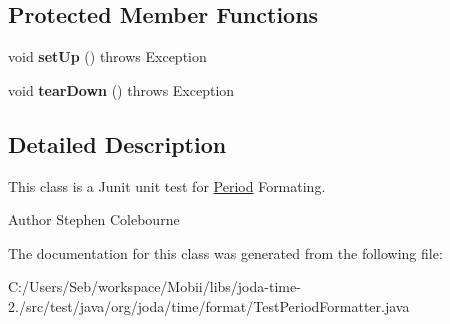 \subsection*{Protected Member Functions}
\begin{DoxyCompactItemize}
\item 
\hypertarget{classorg_1_1joda_1_1time_1_1format_1_1_test_period_formatter_a0102eee1098c9f7e67a7e91f46eb4d3b}{void {\bfseries set\-Up} ()  throws Exception }\label{classorg_1_1joda_1_1time_1_1format_1_1_test_period_formatter_a0102eee1098c9f7e67a7e91f46eb4d3b}

\item 
\hypertarget{classorg_1_1joda_1_1time_1_1format_1_1_test_period_formatter_a5f4ade6b1fa1a08fab2adf672f0fbd80}{void {\bfseries tear\-Down} ()  throws Exception }\label{classorg_1_1joda_1_1time_1_1format_1_1_test_period_formatter_a5f4ade6b1fa1a08fab2adf672f0fbd80}

\end{DoxyCompactItemize}


\subsection{Detailed Description}
This class is a Junit unit test for \hyperlink{classorg_1_1joda_1_1time_1_1_period}{Period} Formating.

\begin{DoxyAuthor}{Author}
Stephen Colebourne 
\end{DoxyAuthor}


The documentation for this class was generated from the following file\-:\begin{DoxyCompactItemize}
\item 
C\-:/\-Users/\-Seb/workspace/\-Mobii/libs/joda-\/time-\/2./src/test/java/org/joda/time/format/Test\-Period\-Formatter.\-java\end{DoxyCompactItemize}
